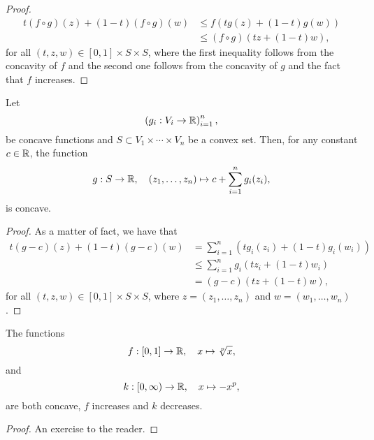 \begin{proof}
  \begin{align*}
    t(f\circ{g})(z)+(1-t)(f\circ{g})(w)
    &\leqslant{f(tg(z)+(1-t)g(w))}\\
    &\leqslant{(f\circ{g})(tz+(1-t)w)},
  \end{align*}
  for all \((t,z,w)\in{[0,1]\times{S}\times{S}}\), where the first inequality
  follows from the concavity of \(f\) and the second one follows from the
  concavity of \(g\) and the fact that \(f\) increases.
\end{proof}

\begin{lemma}\label{lemma:concavity-of-sums-of-concave-functions}
  Let
  \[
    \left(g_{i}:V_{i}\to\mathbb{R}\right)_{i=1}^{n},
  \]
  be concave functions and \(S\subset{V_{1}\times\cdots\times{V_{n}}}\) be a
  convex set. Then, for any constant \(c\in\mathbb{R}\), the function
  \[
    g:S\to\mathbb{R},\quad{(z_{1},\ldots,z_{n})\mapsto{c+\sum_{i=1}^{n}g_{i}(z_{i})}},
  \]
  is concave.
\end{lemma}

\begin{proof}
  As a matter of fact, we have that
  \begin{align*}
    t(g-c)(z)+(1-t)(g-c)(w)
    &=
    \sum_{i=1}^{n}\left(tg_{i}(z_{i})+(1-t)g_{i}(w_{i})\right)
    \\
    &\leqslant
    \sum_{i=1}^{n}g_{i}\left(tz_{i}+(1-t)w_{i}\right)
    \\
    &=
    (g-c)\left(tz+(1-t)w\right),
  \end{align*}
  for all \((t,z,w)\in{[0,1]\times{S}\times{S}}\), where
  \(z=(z_{1},\ldots,z_{n})\) and \(w=(w_{1},\ldots,w_{n})\).
\end{proof}

\begin{lemma}\label{lemma:two-concave-functions}
  The functions
  \begin{equation}\label{eq:f-function}
    f:[0,1]\to\mathbb{R},\quad{x\mapsto{\sqrt[p]{x}}},
  \end{equation}
  and
  \begin{equation}\label{eq:k-function}
    k:[0,\infty)\to\mathbb{R},\quad{x\mapsto{-x^{p}}},
  \end{equation}
  are both concave, \(f\) increases and \(k\) decreases.
\end{lemma}

\begin{proof}
  An exercise to the reader.
\end{proof}

